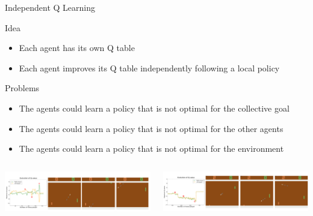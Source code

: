 \documentclass[presentation, 8pt]{beamer}\mode<presentation>{\usetheme{AMSBolognaFC}}
\begin{document}
\begin{frame}{Independent Q Learning}
	\begin{alertblock}{Idea}
		\begin{itemize}
			\item Each agent has its own Q table
			\item Each agent improves its Q table independently following a local policy	
		\end{itemize}
	\end{alertblock}
	\begin{exampleblock}{Problems}
		\begin{itemize}
			\item The agents could learn a policy that is not optimal for the collective goal
			\item The agents could learn a policy that is not optimal for the other agents
			\item The agents could learn a policy that is not optimal for the environment
		\end{itemize}
	\end{exampleblock}
	\begin{columns}
		\begin{column}[b]{0.5\textwidth}
			\href{https://www.youtube.com/watch?v=nn6_GUVDnVw&list=PLfLv_F3r0TwyaZPe50OOUx8tRf0HwdR_u&index=2}{
				\includegraphics[width=\textwidth]{img/competitive.png}}
					
		\end{column}
		\begin{column}[b]{0.5\textwidth}
			\href{https://www.youtube.com/watch?v=Gb9DprIgdGw&list=PLfLv_F3r0TwyaZPe50OOUx8tRf0HwdR_u&index=1}{
				\includegraphics[width=\textwidth]{img/cooperative.png}}
					
		\end{column}
	\end{columns}
\end{frame}
\end{document}

